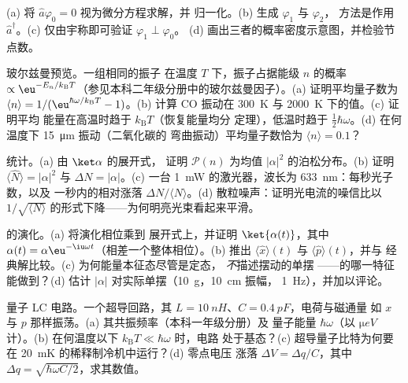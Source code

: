 \begin{exercise}[$\star\star$]\label{exo:b3:harmonic-oscillator:5}
(a) 将 $\hat a\varphi_0 = 0$ 视为微分方程求解，并
归一化。(b) 生成 $\varphi_1$ 与 $\varphi_2$，
方法是作用 $\hat a^\dagger$。(c) 仅由宇称即可验证 $\varphi_1 \perp \varphi_0$。
(d) 画出三者的概率密度示意图，并检验节点数。
\end{exercise}

\begin{exercise}[$\star\star$]\label{exo:b3:harmonic-oscillator:6}
玻尔兹曼预览。一组相同的振子
在温度 $T$ 下，振子占据能级 $n$ 的概率 $\propto
\eu^{-E_n/k_{\text{B}}T}$（参见本科二年级分册中的玻尔兹曼因子）。(a)
证明平均量子数为 $\langle n\rangle =
1/(\eu^{\hbar\omega/k_{\text{B}}T} - 1)$。(b) 计算 CO 振动在
\qty{300}{K} 与 \qty{2000}{K} 下的值。(c) 证明平均
能量在高温时趋于 $k_{\text{B}}T$（恢复能量均分
定理），低温时趋于 $\tfrac12\hbar\omega$。(d) 在何温度下
\qty{15}{\micro m} 振动（二氧化碳的
弯曲振动）平均量子数恰为 $\langle n\rangle = 0.1$？
\end{exercise}

\begin{exercise}[$\star\star$]\label{exo:b3:harmonic-oscillator:7}
统计。(a) 由 $\ket\alpha$ 的展开式，
证明 $\mathcal P(n)$ 为均值 $|\alpha|^2$ 的泊松分布。(b) 证明
$\langle\hat N\rangle = |\alpha|^2$ 与 $\Delta N = |\alpha|$。(c) 一台
\qty{1}{mW} 的激光器，波长为 \qty{633}{nm}：每秒光子数，以及
一秒内的相对涨落 $\Delta N/\langle N\rangle$。(d)
散粒噪声：证明光电流的噪信比以
$1/\sqrt{\langle N\rangle}$ 的形式下降——为何明亮光束看起来平滑。
\end{exercise}

\begin{exercise}[$\star\star$]\label{exo:b3:harmonic-oscillator:8}
的演化。(a) 将演化相位乘到
展开式上，并证明 $\ket{\alpha(t)}$，其中 $\alpha(t) =
\alpha\eu^{-\iu\omega t}$（相差一个整体相位）。(b) 推出
$\langle\hat x\rangle(t)$ 与 $\langle\hat p\rangle(t)$，并与
经典解比较。(c) 为何能量本征态尽管是定态，
\emph{不}描述摆动的单摆
——的哪一特征能做到？(d) 估计 $|\alpha|$
对实际单摆（\qty{10}{g}，\qty{10}{cm} 振幅，
\qty{1}{Hz}），并加以评论。
\end{exercise}

\begin{exercise}[$\star\star$]\label{exo:b3:harmonic-oscillator:9}
量子 LC 电路。一个超导回路，其 $L =
\qty{10}{nH}$、$C = \qty{0.4}{pF}$，电荷与磁通量
如 $x$ 与 $p$ 那样振荡。(a) 其共振频率（本科一年级分册）及
量子能量 $\hbar\omega$（以 $\unit{\micro eV}$ 计）。(b) 在何温度以下
$k_{\text{B}}T \ll \hbar\omega$ 时，电路
处于基态？(c) 超导量子比特为何要在
\qty{20}{mK} 的稀释制冷机中运行？(d) 零点电压
涨落 $\Delta V = \Delta q/C$，其中 $\Delta q =
\sqrt{\hbar\omega C/2}$，求其数值。
\end{exercise}

